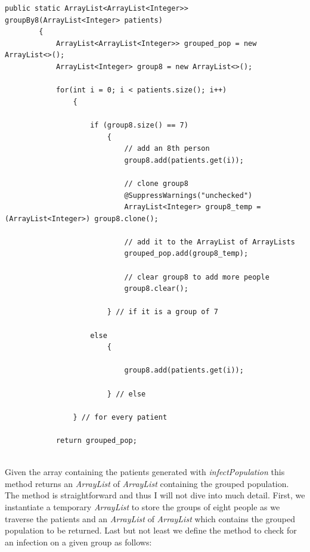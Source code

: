\documentclass[letterpaper, 10pt]{article}
\begin{document}
\begin{lstlisting}
public static ArrayList<ArrayList<Integer>> groupBy8(ArrayList<Integer> patients)
	    {	
	        ArrayList<ArrayList<Integer>> grouped_pop = new ArrayList<>();
	        ArrayList<Integer> group8 = new ArrayList<>();
	
	        for(int i = 0; i < patients.size(); i++)
		        {
		
		            if (group8.size() == 7)
			            {
			                // add an 8th person
			                group8.add(patients.get(i));
			                
			                // clone group8
			                @SuppressWarnings("unchecked")
							ArrayList<Integer> group8_temp = (ArrayList<Integer>) group8.clone();
			                
			                // add it to the ArrayList of ArrayLists
			                grouped_pop.add(group8_temp);
			                
			                // clear group8 to add more people
			                group8.clear();
			                
			            } // if it is a group of 7
		            
		            else
			            {
			                
			                group8.add(patients.get(i));
			
			            } // else
		            
		        } // for every patient

	        return grouped_pop;
\end{lstlisting}
\\
Given the array containing the patients generated with \textit{infectPopulation} this method returns an \textit{ArrayList} of \textit{ArrayList} containing the grouped population. The method is straightforward and thus I will not dive into much detail. First, we instantiate a temporary \textit{ArrayList} to store the groups of eight people as we traverse the patients and an \textit{ArrayList} of \textit{ArrayList} which contains the grouped population to be returned. Last but not least we define the method to check for an infection on a given group as follows:
\end{document}
